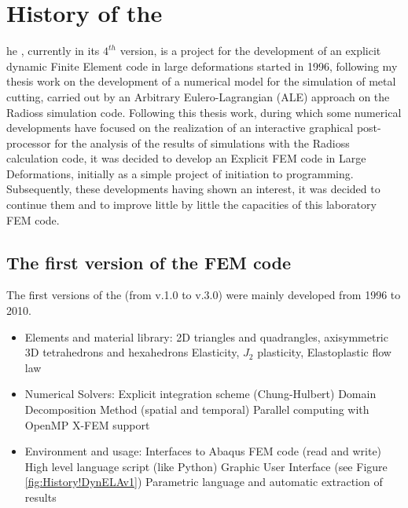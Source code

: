 %
%
%
\chapter{History of the \DynELA}\label{Chapter!History}

\startcontents[chapters]
\printmyminitoc[1]he \DynELA, currently in its $4^{th}$ version, is a project for the development of an explicit dynamic Finite Element code in large deformations started in 1996, following my thesis work on the development of a numerical model for the simulation of metal cutting, carried out by an Arbitrary Eulero-Lagrangian (ALE) approach on the Radioss simulation code. Following this thesis work, during which some numerical developments have focused on the realization of an interactive graphical post-processor for the analysis of the results of simulations with the Radioss calculation code, it was decided to develop an Explicit FEM code in Large Deformations, initially as a simple project of initiation to programming. Subsequently, these developments having shown an interest, it was decided to continue them and to improve little by little the capacities of this laboratory FEM code.

\section{The first version of the FEM code}
The first versions of the \DynELA (from v.1.0 to v.3.0) were mainly developed from 1996 to 2010.
\begin{itemize}
\item Elements and material library:
\subitem 2D triangles and quadrangles, axisymmetric
\subitem 3D tetrahedrons and hexahedrons
\subitem Elasticity, $J_{2}$ plasticity, Elastoplastic flow law
\item Numerical Solvers:
\subitem Explicit integration scheme (Chung-Hulbert)
\subitem Domain Decomposition Method (spatial and temporal)
\subitem Parallel computing with OpenMP
\subitem X-FEM support
\item Environment and usage:
\subitem Interfaces to Abaqus FEM code (read and write)
\subitem High level language script (like Python)
\subitem Graphic User Interface (see Figure \ref{fig:History!DynELAv1})
\subitem Parametric language and automatic extraction of results
\end{itemize}

